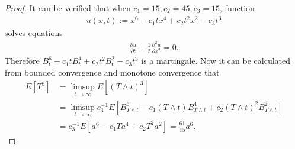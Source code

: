 \documentclass[12pt,a4paper]{amsart}
\theoremstyle{plain}
\theoremstyle{definition}
\theoremstyle{remark}
\numberwithin{equation}{section}
\begin{document}
\begin{proof}
It can be verified that when $c_1 = 15, c_2 = 45, c_3 = 15$, function 
\begin{align}
u(x,t):= x^6 - c_1 tx^4 + c_2 t^2 x^2 - c_3 t^3
\end{align}
solves equations
\begin{align}
\frac{\partial u}{\partial t} + \frac{1}{2} \frac{\partial^2 u}{ \partial x^2} = 0.
\end{align}
Therefore $B_t^6 - c_1tB_t^4+c_2t^2B_t^2-c_3t^3$ is a martingale.
Now it can be calculated from bounded convergence and monotone convergence that
\begin{align}
  E\left[ T^3 \right]
&= \limsup_{t\to \infty} E\left[(T\wedge t)^3\right] 
  \\& =\limsup_{t\to \infty} c_3^{-1}E\left[ B_{T\wedge t}^6 - c_1(T\wedge t)B_{T\wedge t}^4+c_2(T\wedge t)^2 B_{T\wedge t}^2 \right]
  \\& = c_3^{-1}E\left[ a^6 - c_1Ta^4+c_2T^2a^2 \right]
= \frac{61}{15}a^6.
\end{align}
\end{proof}
\end{document}
